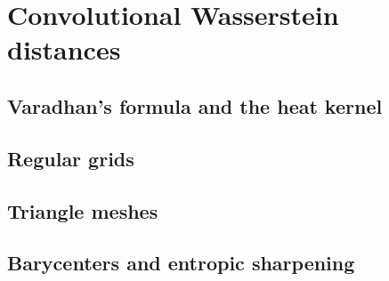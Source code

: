 \section{Convolutional Wasserstein distances}
\label{sec:method}

\subsection{Varadhan's formula and the heat kernel}

\subsection{Regular grids}
\label{sec:method:grids}

\subsection{Triangle meshes}
\label{sec:method:meshes}

\subsection{Barycenters and entropic sharpening}
\label{sec:method:barycenters}
